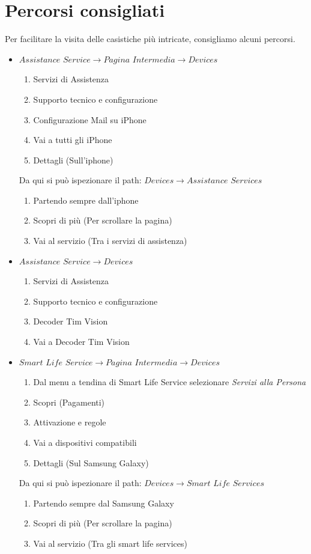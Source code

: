 \documentclass{article}
\begin{document}
	\section{Percorsi consigliati}
	Per facilitare la visita delle casistiche più intricate, consigliamo alcuni percorsi.
	\begin{itemize}
		\item $Assistance$ $Service \rightarrow Pagina$ $Intermedia \rightarrow Devices$
				\begin{enumerate}
					\item Servizi di Assistenza
					\item Supporto tecnico e configurazione
					\item Configurazione Mail su iPhone
					\item Vai a tutti gli iPhone
					\item Dettagli (Sull'iphone)
				\end{enumerate}
				
				Da qui si può ispezionare il path: $Devices \rightarrow Assistance$ $ Services$
				\begin{enumerate}
					\item Partendo sempre dall'iphone
					\item Scopri di più (Per scrollare la pagina)
					\item Vai al servizio (Tra i servizi di assistenza)
				\end{enumerate}
		\item $Assistance$ $Service \rightarrow Devices$
		\begin{enumerate}
			\item Servizi di Assistenza
			\item Supporto tecnico e configurazione
			\item Decoder Tim Vision
			\item Vai a Decoder Tim Vision
		\end{enumerate}
		
		\item $Smart$ $Life$ $Service \rightarrow Pagina$ $Intermedia \rightarrow Devices$
		\begin{enumerate}
			\item Dal menu a tendina di Smart Life Service selezionare \emph{Servizi alla Persona}
			\item Scopri (Pagamenti)
			\item Attivazione e regole
			\item Vai a dispositivi compatibili
			\item Dettagli (Sul Samsung Galaxy)
		\end{enumerate}
			Da qui si può ispezionare il path: $Devices \rightarrow Smart$ $ Life$ $ Services$
			\begin{enumerate}
				\item Partendo sempre dal Samsung Galaxy
				\item Scopri di più (Per scrollare la pagina)
				\item Vai al servizio (Tra gli smart life services)
			\end{enumerate}
			

\end{itemize}
\end{document}
